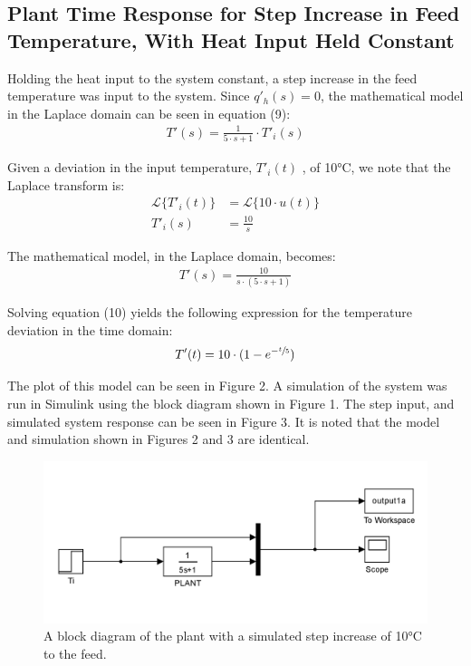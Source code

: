 \documentclass{article}
\begin{document}
\subsection{Plant Time Response for Step Increase in Feed Temperature, With Heat Input Held Constant}
Holding the heat input to the system constant, a step increase in the feed temperature was input to the system. Since $q'_h(s)=0$, the mathematical model in the Laplace domain can be seen in equation (9):
\begin{align}
T'(s) = \frac{1}{5 \cdot s + 1} \cdot T'_i(s)
\end{align} 

Given a deviation in the input temperature, $T'_i(t)$ , of 10$\si{\degreeCelsius}$, we note that the Laplace transform is:
\begin{align*}
\mathscr{L}\{T'_i(t)\} &= \mathscr{L}\{10 \cdot u(t)\}\\
T'_i(s) &= \frac{10}{s}
\end{align*}

The mathematical model, in the Laplace domain, becomes:
\begin{align}
T'(s) = \frac{10}{s \cdot (5 \cdot s + 1)}
\end{align}

Solving equation (10) yields the following expression for the temperature deviation in the time domain:
\begin{align}
T'(t) = 10 \cdot (1 - e^{-\sfrac{t}{5}})
\end{align}

The plot of this model can be seen in Figure 2. A simulation of the system was run in Simulink using the block diagram shown in Figure 1. The step input, and simulated system response can be seen in Figure 3. It is noted that the model and simulation shown in Figures 2 and 3 are identical.

\begin{figure}[h]
\centering
\includegraphics[scale=0.15]{block_1a}
\caption{A block diagram of the plant with a simulated step increase of 10$\si{\degreeCelsius}$ to the feed.}
\end{figure}
\end{document}

